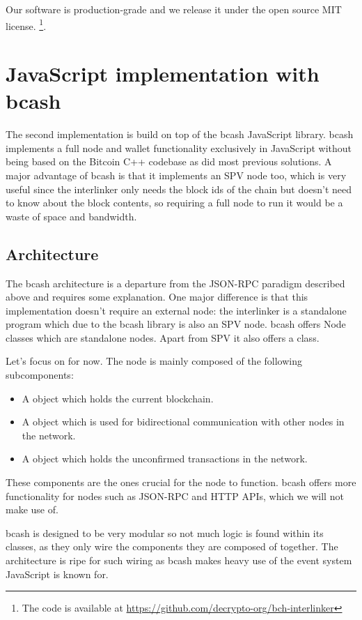 Our software is production-grade and we release it under the open source MIT license.
\footnote{The code is available at \url{https://github.com/decrypto-org/bch-interlinker}}.

\section{JavaScript implementation with bcash}
The second implementation is build on top of the bcash JavaScript library. bcash implements a full node and wallet functionality exclusively in JavaScript without being based on the Bitcoin C++ codebase as did most previous solutions. A major advantage of bcash is that it implements an SPV node too, which is very useful since the interlinker only needs the block ids of the chain but doesn't need to know about the block contents, so requiring a full node to run it would be a waste of space and bandwidth.

\subsection{Architecture}
The bcash architecture is a departure from the JSON-RPC paradigm described above and requires some explanation. One major difference is that this implementation doesn't require an external node: the interlinker is a standalone program which due to the bcash library is also an SPV node. bcash offers Node classes which are standalone nodes. Apart from SPV it also offers a  class.

Let's focus on  for now. The node is mainly composed of the following subcomponents:

\begin{itemize}
  \item A  object which holds the current blockchain.
  \item A  object which is used for bidirectional communication with other nodes in the network.
  \item A  object which holds the unconfirmed transactions in the network.
\end{itemize}

These components are the ones crucial for the node to function. bcash offers more functionality for nodes such as JSON-RPC and HTTP APIs, which we will not make use of.

bcash is designed to be very modular so not much logic is found within its  classes, as they only wire the components they are composed of together. The architecture is ripe for such wiring as bcash makes heavy use of the event system JavaScript is known for.

